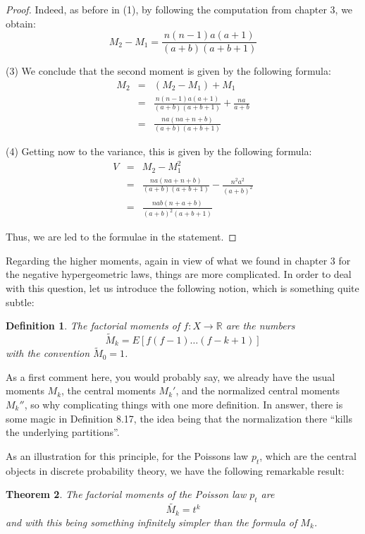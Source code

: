 \documentclass[12pt]{amsbook}
\newtheorem{theorem}{Theorem}[chapter]
\newtheorem{definition}[theorem]{Definition}
\begin{document}
\begin{proof}
Indeed, as before in (1), by following the computation from chapter 3, we obtain:
$$M_2-M_1=\frac{n(n-1)a(a+1)}{(a+b)(a+b+1)}$$

(3) We conclude that the second moment is given by the following formula:
\begin{eqnarray*}
M_2
&=&(M_2-M_1)+M_1\\
&=&\frac{n(n-1)a(a+1)}{(a+b)(a+b+1)}+\frac{na}{a+b}\\
&=&\frac{na(na+n+b)}{(a+b)(a+b+1)}
\end{eqnarray*}

(4) Getting now to the variance, this is given by the following formula:
\begin{eqnarray*}
V
&=&M_2-M_1^2\\
&=&\frac{na(na+n+b)}{(a+b)(a+b+1)}-\frac{n^2a^2}{(a+b)^2}\\
&=&\frac{nab(n+a+b)}{(a+b)^2(a+b+1)}
\end{eqnarray*}

Thus, we are led to the formulae in the statement.
\end{proof}

Regarding the higher moments, again in view of what we found in chapter 3 for the negative hypergeometric laws, things are more complicated. In order to deal with this question, let us introduce the following notion, which is something quite subtle:

\begin{definition}
The factorial moments of $f:X\to\mathbb R$ are the numbers
$$\widetilde{M}_k=E[f(f-1)\ldots(f-k+1)]$$
with the convention $\widetilde{M}_0=1$.
\end{definition}

As a first comment here, you would probably say, we already have the usual moments $M_k$, the central moments $M_k'$, and the normalized central moments $M_k''$, so why complicating things with one more definition. In answer, there is some magic in Definition 8.17, the idea being that the normalization there ``kills the underlying partitions''.

\bigskip

As an illustration for this principle, for the Poissons law $p_t$, which are the central objects in discrete probability theory, we have the following remarkable result:

\begin{theorem}
The factorial moments of the Poisson law $p_t$ are
$$\widetilde{M_k}=t^k$$
and with this being something infinitely simpler than the formula of $M_k$. 
\end{theorem}
\end{document}
